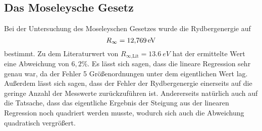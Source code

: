 \subsection{Das Moseleysche Gesetz}
Bei der Untersuchung des Moseleyschen Gesetzes wurde die Rydbergenergie auf
\begin{equation}
    R_\infty = \SI{12,769}{eV}  \notag
\end{equation}
bestimmt.
Zu dem Literaturwert von $R_\text{$\infty$,Lit} = \SI{13,6}{eV}$ hat der ermittelte Wert eine Abweichung von $6,2 \%$.
Es lässt sich sagen, dass die lineare Regression sehr genau war, da der Fehler 5 Größenordnungen unter dem eigentlichen Wert lag.
Außerdem lässt sich sagen, dass der Fehler der Rydbergenergie einerseits auf die geringe Anzahl der Messwerte zurückzuführen ist.
Andererseits natürlich auch auf die Tatsache, dass das eigentliche Ergebnis der Steigung aus der linearen Regression noch quadriert werden musste, wodurch sich auch die Abweichung quadratisch vergrö\ss{}ert.
